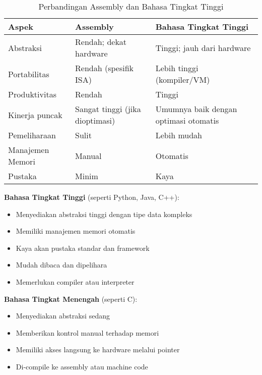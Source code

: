 \documentclass[../main.tex]{subfiles}
\begin{document}
            \begin{table}[H]
                \centering
                \caption{Perbandingan Assembly dan Bahasa Tingkat Tinggi}
                \begin{tabular}{p{} p{} p{}}
                    \hline
                    \textbf{Aspek} & \textbf{Assembly} & \textbf{Bahasa Tingkat Tinggi} \\
                    \hline
                    Abstraksi & Rendah; dekat hardware & Tinggi; jauh dari hardware \\
                    Portabilitas & Rendah (spesifik ISA) & Lebih tinggi (kompiler/VM) \\
                    Produktivitas & Rendah & Tinggi \\
                    Kinerja puncak & Sangat tinggi (jika dioptimasi) & Umumnya baik dengan optimasi otomatis \\
                    Pemeliharaan & Sulit & Lebih mudah \\
                    Manajemen Memori & Manual & Otomatis \\
                    Pustaka & Minim & Kaya \\
                    \hline
                \end{tabular}
                \label{tab:assembly-vs-high-level}
            \end{table}

            \textbf{Bahasa Tingkat Tinggi} (seperti Python, Java, C++):
            \begin{itemize}
                \item Menyediakan abstraksi tinggi dengan tipe data kompleks
                \item Memiliki manajemen memori otomatis
                \item Kaya akan pustaka standar dan framework
                \item Mudah dibaca dan dipelihara
                \item Memerlukan compiler atau interpreter
            \end{itemize}

            \textbf{Bahasa Tingkat Menengah} (seperti C):
            \begin{itemize}
                \item Menyediakan abstraksi sedang
                \item Memberikan kontrol manual terhadap memori
                \item Memiliki akses langsung ke hardware melalui pointer
                \item Di-compile ke assembly atau machine code
            \end{itemize}
\end{document}
